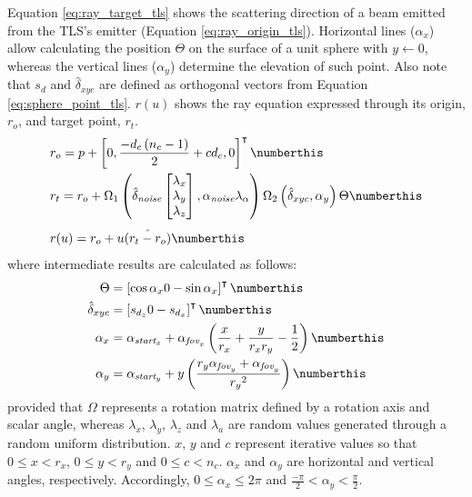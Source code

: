 Equation \ref{eq:ray_target_tls} shows the scattering direction of a beam emitted from the TLS's emitter (Equation \ref{eq:ray_origin_tls}). Horizontal lines ($\alpha_{x}$) allow calculating the position $\Theta$ on the surface of a unit sphere with $y \gets 0$, whereas the vertical lines ($\alpha_{y}$) determine the elevation of such point. Also note that $s_{d}$ and $\hat{\delta}_{xyc}$ are defined as orthogonal vectors from Equation \ref{eq:sphere_point_tls}. $r(u)$ shows the ray equation expressed through its origin, $r_{o}$, and target point, $r_{t}$. 
\begin{align*}
    &r_{o} = p + \left[0, \frac{-d_{c}\left(n_{c} - 1\right)}{2} + c d_{c}, 0\right]^\intercal 
    \numberthis \label{eq:ray_origin_tls}\\
    &r_{t} = r_{o} + \Omega_{1}\left(\hat{\delta}_{\textit{noise}}\begin{bmatrix}\lambda_{x} \\ \lambda_{y} \\ \lambda_{z} \end{bmatrix}, \alpha_{\textit{noise}}\lambda_{\alpha}\right) \Omega_{2}\left(\hat{\delta}_{xyc}, \alpha_{y}\right) \Theta
    \numberthis \label{eq:ray_target_tls}\\[.4em]
    &r(u) = r_o + u\hat{\left(r_{t} - r_{o}\right)}
    \numberthis \label{eq:ray_equation_tls}
\end{align*}
where intermediate results are calculated as follows:
\begin{align*}
    \Theta &= \left[\cos{\alpha_{x}} 0 -\sin{\alpha_{x}}\right]^\intercal 
    \numberthis \label{eq:sphere_point_tls}\\
    \hat{\delta}_{xyc} &= \left[s_{d_{z}} 0 -s_{d_{x}}\right]^\intercal
    \numberthis \label{eq:sphere_angle_tls}\\
    \alpha_{x} &= \alpha_{\textit{start}_{x}} + \alpha_{\textit{fov}_{x}}\left(\frac{x}{r_{x}} + \frac{y}{ r_{x}r_{y}} - \frac{1}{2}\right)
    \numberthis \label{eq:horizontal_angle_tls}\\
    \alpha_{y} &= \alpha_{\textit{start}_{y}} + y\left(\frac{r_{y}\alpha_{\textit{fov}_{y}} + \alpha_{\textit{fov}_{y}}}{{r_{y}}^2}\right)
    \numberthis \label{eq:vertical_angle_tls}
\end{align*}
provided that $\Omega$ represents a rotation matrix defined by a rotation axis and scalar angle, whereas $\lambda_{x}$, $\lambda_{y}$, $\lambda_{z}$ and $\lambda_{a}$ are random values generated through a random uniform distribution. $x$, $y$ and $c$ represent iterative values so that $0 \leq x < r_{x}$, $0 \leq y < r_{y}$ and $0 \leq c < n_{c}$. $\alpha_{x}$ and $\alpha_{y}$ are horizontal and vertical angles, respectively. Accordingly, $0 \leq \alpha_{x} \leq 2\pi$ and $\frac{-\pi}{2} < \alpha_{y} < \frac{\pi}{2}$. 

